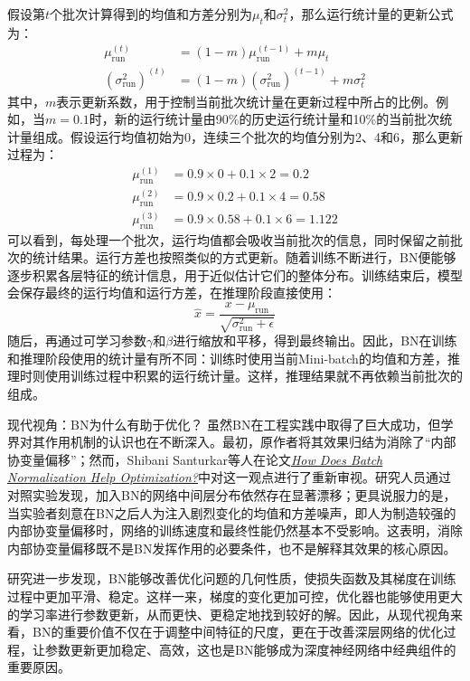 假设第$t$个批次计算得到的均值和方差分别为$\mu_t$和$\sigma_t^2$，那么运行统计量的更新公式为：
$$
\begin{aligned}
\mu_{\mathrm{run}}^{(t)}
&=(1-m)\mu_{\mathrm{run}}^{(t-1)}+m\mu_t\\
(\sigma_{\mathrm{run}}^2)^{(t)}
&=(1-m)(\sigma_{\mathrm{run}}^2)^{(t-1)}+m\sigma_t^2
\end{aligned}
$$
其中，$m$表示更新系数，用于控制当前批次统计量在更新过程中所占的比例。例如，当$m=0.1$时，新的运行统计量由90\%的历史运行统计量和10\%的当前批次统计量组成。假设运行均值初始为0，连续三个批次的均值分别为2、4和6，那么更新过程为：
\begin{align*}
\mu_{\mathrm{run}}^{(1)}&=0.9\times0+0.1\times2=0.2\\
\mu_{\mathrm{run}}^{(2)}&=0.9\times0.2+0.1\times4=0.58\\
\mu_{\mathrm{run}}^{(3)}&=0.9\times0.58+0.1\times6=1.122
\end{align*}
可以看到，每处理一个批次，运行均值都会吸收当前批次的信息，同时保留之前批次的统计结果。运行方差也按照类似的方式更新。随着训练不断进行，BN便能够逐步积累各层特征的统计信息，用于近似估计它们的整体分布。训练结束后，模型会保存最终的运行均值和运行方差，在推理阶段直接使用：
$$
\hat{x}=\frac{x-\mu_{\mathrm{run}}}{\sqrt{\sigma_{\mathrm{run}}^2+\epsilon}}
$$
随后，再通过可学习参数$\gamma$和$\beta$进行缩放和平移，得到最终输出。因此，BN在训练和推理阶段使用的统计量有所不同：训练时使用当前Mini-batch的均值和方差，推理时则使用训练过程中积累的运行统计量。这样，推理结果就不再依赖当前批次的组成。

\begin{purpleBox}{现代视角：BN为什么有助于优化？}
虽然BN在工程实践中取得了巨大成功，但学界对其作用机制的认识也在不断深入。最初，原作者将其效果归结为消除了“内部协变量偏移”；然而，Shibani Santurkar等人在论文\href{https://arxiv.org/abs/1805.11604}{\textit{How Does Batch Normalization Help Optimization?}}中对这一观点进行了重新审视。研究人员通过对照实验发现，加入BN的网络中间层分布依然存在显著漂移；更具说服力的是，当实验者刻意在BN之后人为注入剧烈变化的均值和方差噪声，即人为制造较强的内部协变量偏移时，网络的训练速度和最终性能仍然基本不受影响。这表明，消除内部协变量偏移既不是BN发挥作用的必要条件，也不是解释其效果的核心原因。

研究进一步发现，BN能够改善优化问题的几何性质，使损失函数及其梯度在训练过程中更加平滑、稳定。这样一来，梯度的变化更加可控，优化器也能够使用更大的学习率进行参数更新，从而更快、更稳定地找到较好的解。因此，从现代视角来看，BN的重要价值不仅在于调整中间特征的尺度，更在于改善深层网络的优化过程，让参数更新更加稳定、高效，这也是BN能够成为深度神经网络中经典组件的重要原因。
\end{purpleBox}

